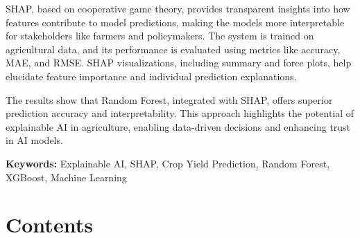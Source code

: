 \documentclass[a4paper,11pt,oneside]{book}
\begin{document}
SHAP, based on cooperative game theory, provides transparent insights into how features contribute to model predictions, making the models more interpretable for stakeholders like farmers and policymakers. The system is trained on agricultural data, and its performance is evaluated using metrics like accuracy, MAE, and RMSE. SHAP visualizations, including summary and force plots, help elucidate feature importance and individual prediction explanations.

The results show that Random Forest, integrated with SHAP, offers superior prediction accuracy and interpretability. This approach highlights the potential of explainable AI in agriculture, enabling data-driven decisions and enhancing trust in AI models.

\vspace{1cm}
\noindent\textbf{Keywords:} Explainable AI, SHAP, Crop Yield Prediction, Random Forest, XGBoost, Machine Learning

\newpage


\chapter*{Contents}
\end{document}
